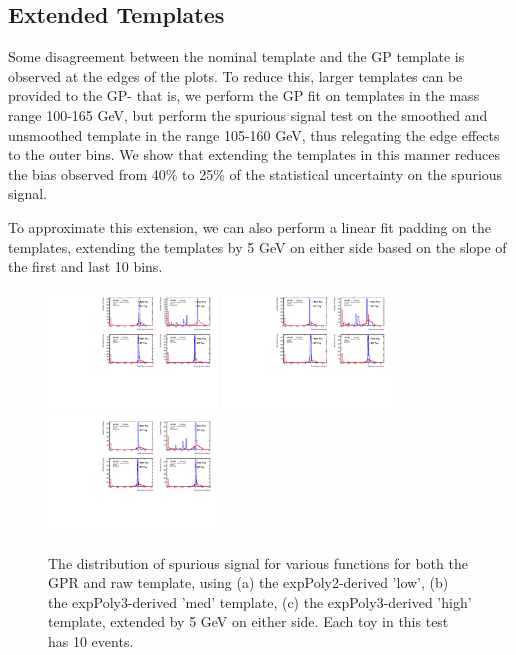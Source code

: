 \subsection{Extended Templates}

Some disagreement between the nominal template and the GP template is observed at the edges of the plots. To reduce this, larger templates can be provided to the GP- that is, we perform the GP fit on templates in the mass range 100-165 GeV, but perform the spurious signal test on the smoothed and unsmoothed template in the range 105-160 GeV, thus relegating the edge effects to the outer bins. We show that extending the templates in this manner reduces the bias observed from 40\% to 25\% of the statistical uncertainty on the spurious signal.

To approximate this extension, we can also perform a linear fit padding on the templates, extending the templates by 5 GeV on either side based on the slope of the first and last 10 bins. 

\begin{figure} 
\begin{center}
  \includegraphics[width=0.4\textwidth]{figures/background/gpr/validation/padded/ToyTest_FitSigVals_lowpT_10_noSig}   
  \includegraphics[width=0.4\textwidth]{figures/background/gpr/validation/padded/ToyTest_FitSigVals_medpT_10_noSig}   
  \includegraphics[width=0.4\textwidth]{figures/background/gpr/validation/padded/ToyTest_FitSigVals_highpT_10_noSig}   
\caption{The distribution of spurious signal for various functions for both the GPR and raw template, using (a) the expPoly2-derived 'low', (b) the expPoly3-derived 'med' template, (c) the expPoly3-derived 'high' template, extended by 5 GeV on either side. Each toy in this test has 10 events.}
\label{fig:padded_lowpt_10_noSig}
\end{center}
\end{figure}

